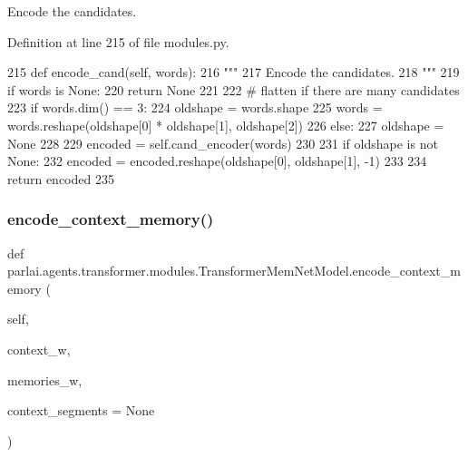 \begin{DoxyVerb}Encode the candidates.
\end{DoxyVerb}
 

Definition at line 215 of file modules.\+py.


\begin{DoxyCode}
215     \textcolor{keyword}{def }encode\_cand(self, words):
216         \textcolor{stringliteral}{"""}
217 \textcolor{stringliteral}{        Encode the candidates.}
218 \textcolor{stringliteral}{        """}
219         \textcolor{keywordflow}{if} words \textcolor{keywordflow}{is} \textcolor{keywordtype}{None}:
220             \textcolor{keywordflow}{return} \textcolor{keywordtype}{None}
221 
222         \textcolor{comment}{# flatten if there are many candidates}
223         \textcolor{keywordflow}{if} words.dim() == 3:
224             oldshape = words.shape
225             words = words.reshape(oldshape[0] * oldshape[1], oldshape[2])
226         \textcolor{keywordflow}{else}:
227             oldshape = \textcolor{keywordtype}{None}
228 
229         encoded = self.cand\_encoder(words)
230 
231         \textcolor{keywordflow}{if} oldshape \textcolor{keywordflow}{is} \textcolor{keywordflow}{not} \textcolor{keywordtype}{None}:
232             encoded = encoded.reshape(oldshape[0], oldshape[1], -1)
233 
234         \textcolor{keywordflow}{return} encoded
235 
\end{DoxyCode}
\mbox{\label{classparlai_1_1agents_1_1transformer_1_1modules_1_1TransformerMemNetModel_a12c6c4a26be5401e61c43ec4aa886812}} 
\subsubsection{\texorpdfstring{encode\+\_\+context\+\_\+memory()}{encode\_context\_memory()}}
{\footnotesize\ttfamily def parlai.\+agents.\+transformer.\+modules.\+Transformer\+Mem\+Net\+Model.\+encode\+\_\+context\+\_\+memory (\begin{DoxyParamCaption}\item[{}]{self,  }\item[{}]{context\+\_\+w,  }\item[{}]{memories\+\_\+w,  }\item[{}]{context\+\_\+segments = {\ttfamily None} }\end{DoxyParamCaption})}

